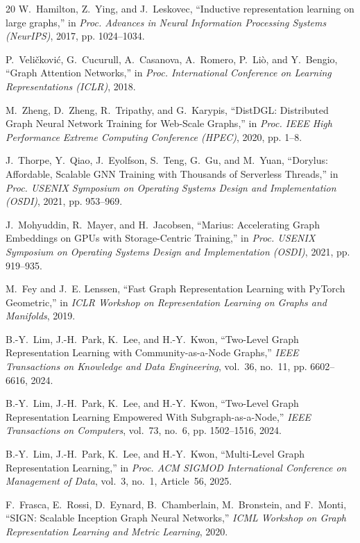 \documentclass[conference,compsoc]{IEEEtran}
\begin{document}
\begin{thebibliography}{20}
W.~Hamilton, Z.~Ying, and J.~Leskovec, ``Inductive representation learning on large graphs,'' in \emph{Proc. Advances in Neural Information Processing Systems (NeurIPS)}, 2017, pp. 1024--1034.

P.~Veli{\v{c}}kovi{\'c}, G.~Cucurull, A.~Casanova, A.~Romero, P.~Li{\`o}, and Y.~Bengio, ``Graph Attention Networks,'' in \emph{Proc. International Conference on Learning Representations (ICLR)}, 2018.

M.~Zheng, D.~Zheng, R.~Tripathy, and G.~Karypis, ``DistDGL: Distributed Graph Neural Network Training for Web-Scale Graphs,'' in \emph{Proc. IEEE High Performance Extreme Computing Conference (HPEC)}, 2020, pp. 1--8.

J.~Thorpe, Y.~Qiao, J.~Eyolfson, S.~Teng, G.~Gu, and M.~Yuan, ``Dorylus: Affordable, Scalable GNN Training with Thousands of Serverless Threads,'' in \emph{Proc. USENIX Symposium on Operating Systems Design and Implementation (OSDI)}, 2021, pp. 953--969.

J.~Mohyuddin, R.~Mayer, and H.~Jacobsen, ``Marius: Accelerating Graph Embeddings on GPUs with Storage-Centric Training,'' in \emph{Proc. USENIX Symposium on Operating Systems Design and Implementation (OSDI)}, 2021, pp. 919--935.

M.~Fey and J.~E. Lenssen, ``Fast Graph Representation Learning with PyTorch Geometric,'' in \emph{ICLR Workshop on Representation Learning on Graphs and Manifolds}, 2019.

B.-Y.~Lim, J.-H.~Park, K.~Lee, and H.-Y.~Kwon, ``Two-Level Graph Representation Learning with Community-as-a-Node Graphs,'' \emph{IEEE Transactions on Knowledge and Data Engineering}, vol.~36, no.~11, pp. 6602--6616, 2024.

B.-Y.~Lim, J.-H.~Park, K.~Lee, and H.-Y.~Kwon, ``Two-Level Graph Representation Learning Empowered With Subgraph-as-a-Node,'' \emph{IEEE Transactions on Computers}, vol.~73, no.~6, pp. 1502--1516, 2024.

B.-Y.~Lim, J.-H.~Park, K.~Lee, and H.-Y.~Kwon, ``Multi-Level Graph Representation Learning,'' in \emph{Proc. ACM SIGMOD International Conference on Management of Data}, vol.~3, no.~1, Article~56, 2025.

F.~Frasca, E.~Rossi, D.~Eynard, B.~Chamberlain, M.~Bronstein, and F.~Monti, ``SIGN: Scalable Inception Graph Neural Networks,'' \emph{ICML Workshop on Graph Representation Learning and Metric Learning}, 2020.


\end{thebibliography}
\end{document}

